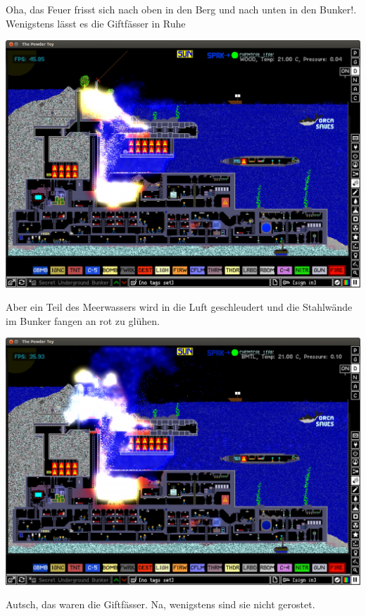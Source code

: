 \documentclass[10pt,a4paper,ngerman,twoside]{article} %
\begin{document}
\begin{multicols}{2}
Oha, das Feuer frisst sich nach oben in den Berg und nach unten in den Bunker!. Wenigstens lässt es die Giftfässer in Ruhe
\begin{center}
\includegraphics[width=\linewidth]{powdertoy/powdertoy-bu5.png}
\end{center}
Aber ein Teil des Meerwassers wird in die Luft geschleudert und die Stahlwände im Bunker fangen an rot zu glühen.
\begin{center}
\includegraphics[width=\linewidth]{powdertoy/powdertoy-bu6.png}
\end{center}
Autsch, das waren die Giftfässer. Na, wenigstens sind sie nicht gerostet.
\begin{center}

\end{center}
\end{multicols}
\end{document}
